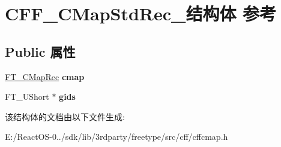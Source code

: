 \hypertarget{struct_c_f_f___c_map_std_rec__}{}\section{C\+F\+F\+\_\+\+C\+Map\+Std\+Rec\+\_\+结构体 参考}
\label{struct_c_f_f___c_map_std_rec__}
\subsection*{Public 属性}
\begin{DoxyCompactItemize}
\item 
\mbox{\label{struct_c_f_f___c_map_std_rec___ac6d3f72081f23021a7bc1786a33bf53a}} 
\hyperlink{struct_f_t___c_map_rec__}{F\+T\+\_\+\+C\+Map\+Rec} {\bfseries cmap}
\item 
\mbox{\label{struct_c_f_f___c_map_std_rec___a3ed3062bdd37dc60c7d9621c2d6e84d8}} 
F\+T\+\_\+\+U\+Short $\ast$ {\bfseries gids}
\end{DoxyCompactItemize}


该结构体的文档由以下文件生成\+:\begin{DoxyCompactItemize}
\item 
E\+:/\+React\+O\+S-\/0../sdk/lib/3rdparty/freetype/src/cff/cffcmap.\+h\end{DoxyCompactItemize}
